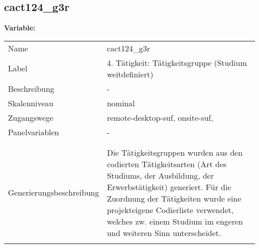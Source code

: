 	
	
	\subsection{cact124\_g3r}
	\label{subSection:cact124_g3r}

	\noindent\textbf{Variable:}\\
		\begin{tabular}{lL{11.3cm}}
			\label{tableVariable:cact124_g3r}
			Name & cact124\_g3r \\
			Label & 4. Tätigkeit: Tätigkeitsgruppe (Studium weitdefiniert) \\
			Beschreibung & - \\
			Skalenniveau & nominal \\
			Zugangswege &
				remote-desktop-suf,
				onsite-suf,
 \\
			Panelvariablen & -
			 \\
			 \\
 \\
					Generierungsbeschreibung & Die Tätigkeitsgruppen wurden aus den codierten Tätigkeitsarten (Art des Studiums, der Ausbildung, der Erwerbstätigkeit) generiert. Für die Zuordnung der Tätigkeiten wurde eine projekteigene Codierliste verwendet, welches zw. einem Studium im engeren und weiteren Sinn unterscheidet.
				 \\	
			 \\
		\end{tabular}






